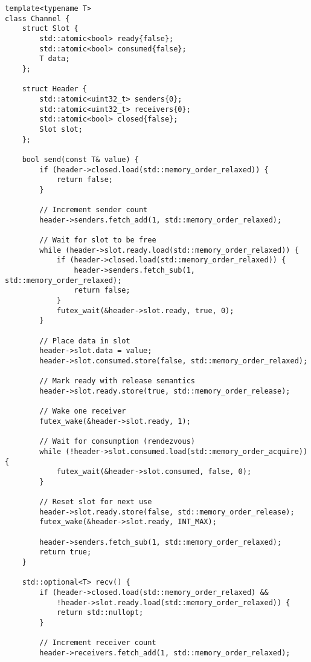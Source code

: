 \documentclass[11pt]{article}
\begin{document}
\begin{lstlisting}[caption={Unbuffered Channel with Rendezvous}]
template<typename T>
class Channel {
    struct Slot {
        std::atomic<bool> ready{false};
        std::atomic<bool> consumed{false};
        T data;
    };
    
    struct Header {
        std::atomic<uint32_t> senders{0};
        std::atomic<uint32_t> receivers{0};
        std::atomic<bool> closed{false};
        Slot slot;
    };
    
    bool send(const T& value) {
        if (header->closed.load(std::memory_order_relaxed)) {
            return false;
        }
        
        // Increment sender count
        header->senders.fetch_add(1, std::memory_order_relaxed);
        
        // Wait for slot to be free
        while (header->slot.ready.load(std::memory_order_relaxed)) {
            if (header->closed.load(std::memory_order_relaxed)) {
                header->senders.fetch_sub(1, std::memory_order_relaxed);
                return false;
            }
            futex_wait(&header->slot.ready, true, 0);
        }
        
        // Place data in slot
        header->slot.data = value;
        header->slot.consumed.store(false, std::memory_order_relaxed);
        
        // Mark ready with release semantics
        header->slot.ready.store(true, std::memory_order_release);
        
        // Wake one receiver
        futex_wake(&header->slot.ready, 1);
        
        // Wait for consumption (rendezvous)
        while (!header->slot.consumed.load(std::memory_order_acquire)) {
            futex_wait(&header->slot.consumed, false, 0);
        }
        
        // Reset slot for next use
        header->slot.ready.store(false, std::memory_order_release);
        futex_wake(&header->slot.ready, INT_MAX);
        
        header->senders.fetch_sub(1, std::memory_order_relaxed);
        return true;
    }
    
    std::optional<T> recv() {
        if (header->closed.load(std::memory_order_relaxed) && 
            !header->slot.ready.load(std::memory_order_relaxed)) {
            return std::nullopt;
        }
        
        // Increment receiver count
        header->receivers.fetch_add(1, std::memory_order_relaxed);
        

\end{lstlisting}
\end{document}

